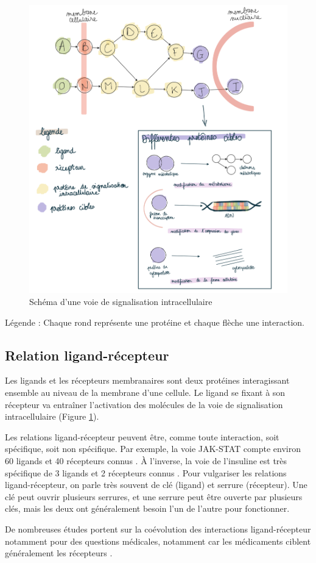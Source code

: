 \begin{figure}[H]
    \centering
    \includegraphics[width=1\textwidth]{figures/corps/figure12.png}
    \caption{Schéma d'une voie de signalisation intracellulaire}
    \label{fig:12_signa}
\end{figure}
Légende : Chaque rond représente une protéine et chaque flèche une interaction.  \newpage

\subsection{Relation ligand-récepteur}\label{ligrec}
\par Les ligands et les récepteurs membranaires sont deux protéines interagissant ensemble au niveau de la membrane d’une cellule. Le ligand se fixant à son récepteur va entraîner l’activation des molécules de la voie de signalisation intracellulaire (Figure \ref{fig:12_signa}).
\par Les relations ligand-récepteur peuvent être, comme toute interaction, soit spécifique, soit non spécifique. Par exemple, la voie JAK-STAT compte environ 60 ligands et 40 récepteurs connus \parencite{darnell_jak-stat_1994}. À l’inverse, la voie de l’insuline est très spécifique de 3 ligands et 2 récepteurs connus \parencite{leroith_insulin-like_2021}. Pour vulgariser les relations ligand-récepteur, on parle très souvent de clé (ligand) et serrure (récepteur). Une clé peut ouvrir plusieurs serrures, et une serrure peut être ouverte par plusieurs clés, mais les deux ont généralement besoin l’un de l’autre pour fonctionner. 
\par De nombreuses études portent sur la coévolution des interactions ligand-récepteur notamment pour des questions médicales, notamment car les médicaments ciblent généralement les récepteurs \parencite{de_jong_receptor-ligand_2005, pluder_proteome_2006, woolhouse_biological_2002}. 

